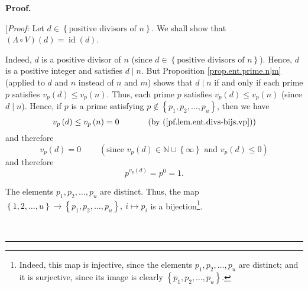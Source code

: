 \documentclass[numbers=enddot,12pt,final,onecolumn,notitlepage]{scrartcl}%
\numberwithin{exer}{subsection}
\theoremstyle{definition}
\newenvironment{fineprint}{\begin{small}}{\end{small}}
\newenvironment{proof}[1][Proof]{\noindent\textbf{#1.} }{\ \rule{0.5em}{0.5em}}
\begin{document}
\begin{proof}
\begin{fineprint}
[\textit{Proof:} Let $d\in\left\{  \text{positive divisors of }n\right\}  $.
We shall show that $\left(  \Lambda\circ V\right)  \left(  d\right)
=\operatorname*{id}\left(  d\right)  $.

Indeed, $d$ is a positive divisor of $n$ (since $d\in\left\{  \text{positive
divisors of }n\right\}  $). Hence, $d$ is a positive integer and satisfies
$d\mid n$. But Proposition \ref{prop.ent.prime.n|m} (applied to $d$ and $n$
instead of $n$ and $m$) shows that $d\mid n$ if and only if each prime $p$
satisfies $v_{p}\left(  d\right)  \leq v_{p}\left(  n\right)  $. Thus, each
prime $p$ satisfies $v_{p}\left(  d\right)  \leq v_{p}\left(  n\right)  $
(since $d\mid n$). Hence, if $p$ is a prime satisfying $p\notin\left\{
p_{1},p_{2},\ldots,p_{u}\right\}  $, then we have%
\[
v_{p}\left(  d\right)  \leq v_{p}\left(  n\right)
=0\ \ \ \ \ \ \ \ \ \ \left(  \text{by (\ref{pf.lem.ent.divs-bijs.vp}%
)}\right)
\]
and therefore
\[
v_{p}\left(  d\right)  =0\ \ \ \ \ \ \ \ \ \ \left(  \text{since }v_{p}\left(
d\right)  \in\mathbb{N}\cup\left\{  \infty\right\}  \text{ and }v_{p}\left(
d\right)  \leq0\right)
\]
and therefore%
\begin{equation}
p^{v_{p}\left(  d\right)  }=p^{0}=1. \label{pf.lem.ent.divs-bijs.LVid.pf.2}%
\end{equation}


The elements $p_{1},p_{2},\ldots,p_{u}$ are distinct. Thus, the map $\left\{
1,2,\ldots,u\right\}  \rightarrow\left\{  p_{1},p_{2},\ldots,p_{u}\right\}
,\ i\mapsto p_{i}$ is a bijection\footnote{Indeed, this map is injective,
since the elements $p_{1},p_{2},\ldots,p_{u}$ are distinct; and it is
surjective, since its image is clearly $\left\{  p_{1},p_{2},\ldots
,p_{u}\right\}  $.}.


\end{fineprint}
\end{proof}
\end{document}
